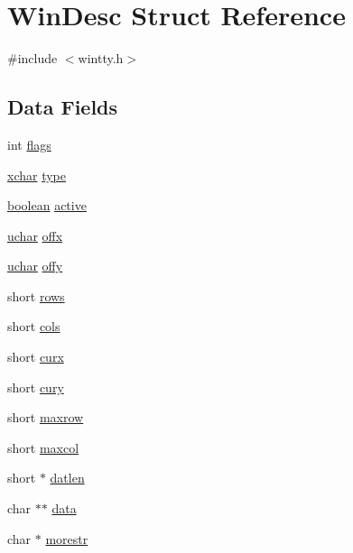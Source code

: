 \hypertarget{structWinDesc}{\section{Win\+Desc Struct Reference}
\label{structWinDesc}
}


{\ttfamily \#include $<$wintty.\+h$>$}

\subsection*{Data Fields}
\begin{DoxyCompactItemize}
\item 
int \hyperlink{structWinDesc_af829a16b38df33481ab03aa9ad5a3f6a}{flags}
\item 
\hyperlink{global_8h_a2043b7d01ce89f4ee2fa6c345a752d32}{xchar} \hyperlink{structWinDesc_a822c0b26f00f618fc89fadb389cd8bfa}{type}
\item 
\hyperlink{global_8h_a531b10dd351aa162d7dcccd1966308b8}{boolean} \hyperlink{structWinDesc_aa4d66d194e554df15cba45501b71b834}{active}
\item 
\hyperlink{config_8h_a65f85814a8290f9797005d3b28e7e5fc}{uchar} \hyperlink{structWinDesc_a36008e8c04406de92c311bce7b984134}{offx}
\item 
\hyperlink{config_8h_a65f85814a8290f9797005d3b28e7e5fc}{uchar} \hyperlink{structWinDesc_a93252f6a46614ef89276da2d7889df76}{offy}
\item 
short \hyperlink{structWinDesc_a078492b79dc8211d11efdb70ab2ad92e}{rows}
\item 
short \hyperlink{structWinDesc_a0ff70b5ac1a9c98074a6bdb4bae3a444}{cols}
\item 
short \hyperlink{structWinDesc_a2653ff0d07637546278df006bd4147a6}{curx}
\item 
short \hyperlink{structWinDesc_a6d29483f0286673c97985cb69dab4499}{cury}
\item 
short \hyperlink{structWinDesc_a1430ad2487a24e423a91207766299547}{maxrow}
\item 
short \hyperlink{structWinDesc_ad071abd082c1445ab11e92fef063ac11}{maxcol}
\item 
short $\ast$ \hyperlink{structWinDesc_a16d5076c67644a5736b415e8f613d04e}{datlen}
\item 
char $\ast$$\ast$ \hyperlink{structWinDesc_ac2373cc97ba4f5d553ee3e6658202c3c}{data}
\item 
char $\ast$ \hyperlink{structWinDesc_a803538ce4649c8df737affa75754f338}{morestr}
\item 
$$
\end{DoxyCompactItemize}
